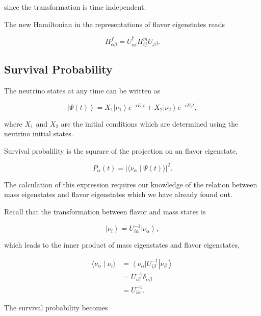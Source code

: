 \documentclass{tufte-handout}
\newcommand{\bra}[1]{\left\langle #1\right|}
\newcommand{\ket}[1]{\left| #1\right\rangle}
\newcommand{\braket}[2]{\langle #1 \mid #2 \rangle}
\begin{document}
since the transformation is time independent.

The new Hamiltonian in the representations of flavor eigenstates reads

\begin{equation}
H^f_{\alpha\beta}  = U^\dagger_{\alpha i} H^m_{ij} U_{j\beta}.
\end{equation}



\subsection{Survival Probability}


The neutrino states at any time can be written as

\begin{equation}
\ket{\Psi(t)}  = X_1 \ket{\nu_1 } e^{-i E_1 t}+ X_2 \ket{ \nu_2 } e^{-i E_2 t},
\end{equation}

where $X_1$ and $X_2$ are the initial conditions which are determined using the neutrino initial states.

Survival probalility is the squrare of the projection on an flavor eigenstate,

\begin{equation}
P_{\alpha}(t) = \lvert \braket{\nu_{\alpha}}{\Psi(t)} \rvert^2.
\end{equation}

The calculation of this expression requires our knowledge of the relation between mass eigenstates and flavor eigenstates which we have already found out.

Recall that the transformation between flavor and mass states is

\begin{equation}
\ket{\nu_i} = U^{-1}_{i\alpha} \ket{\nu_\alpha},
\end{equation}

which leads to the inner product of mass eigenstates and flavor eigenstates,

\begin{align}
\braket{\nu_\alpha}{\nu_i} &= \bra{\nu_\alpha} U^{-1}_{i\beta} \ket{\nu_\beta} \\
& = U^{-1}_{i\beta}\delta_{\alpha\beta} \\
& = U^{-1}_{i\alpha}.
\end{align}


The survival probability becomes
\end{document}
